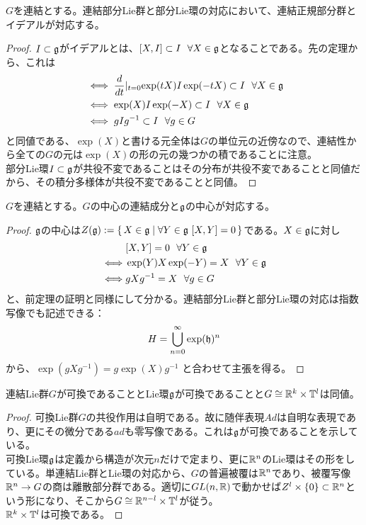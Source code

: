 \begin{thm}[正規部分群とイデアル]
    $G$を連結とする。連結部分Lie群と部分Lie環の対応において、連結正規部分群とイデアルが対応する。
\end{thm}
\begin{proof}
    $I\subset\mathfrak{g}$がイデアルとは、$[X,I]\subset I\ \ \forall X\in\mathfrak{g}$となることである。先の定理から、これは
    \begin{align*}
        &\iff\diff{}{t}\lvert_{t=0}\exp(tX)I\exp(-tX)\subset I\ \ \forall X\in\g\\
        &\iff\exp(X)I\exp(-X)\subset I\ \ \forall X\in\g\\
        &\iff gIg^{-1}\subset I\ \ \forall g\in G
    \end{align*}
    と同値である、$\exp(X)$と書ける元全体は$G$の単位元の近傍なので、連結性から全ての$G$の元は$\exp(X)$の形の元の幾つかの積であることに注意。\\
    部分Lie環$I\subset\mathfrak{g}$が共役不変であることはその分布が共役不変であることと同値だから、その積分多様体が共役不変であることと同値。
\end{proof}
\begin{thm}[中心と中心]
    $G$を連結とする。$G$の中心の連結成分と$\mathfrak{g}$の中心が対応する。
\end{thm}
\begin{proof}
    $\mathfrak{g}$の中心は$Z(\g):=\set{X\in\g}{\forall Y\in\g\ [X,Y]=0}$である。$X\in\mathfrak{g}$に対し
    \begin{align*}
        & [X,Y]=0\ \ \forall Y\in\mathfrak{g}\\
        \iff & \exp(Y)X\exp(-Y)=X\ \ \forall Y\in\mathfrak{g}\\
        \iff & gXg^{-1}=X\ \ \forall g\in G
    \end{align*}
    と、前定理の証明と同様にして分かる。連結部分Lie群と部分Lie環の対応は指数写像でも記述できる：
    \[H=\bigcup_{n=0}^\infty \exp(\mathfrak{h})^n\]
    から、$\exp(gXg^{-1})=g\exp(X)g^{-1}$ と合わせて主張を得る。
\end{proof}
\begin{lem}[可換]
    連結Lie群$G$が可換であることとLie環$\mathfrak{g}$が可換であることと$G\cong\mathbb{R}^k\times\mathbb{T}^l$は同値。
\end{lem}
\begin{proof}
    可換Lie群$G$の共役作用は自明である。故に随伴表現$Ad$は自明な表現であり、更にその微分である$ad$も零写像である。これは$\mathfrak{g}$が可換であることを示している。\\
    可換Lie環$\mathfrak{g}$は定義から構造が次元$n$だけで定まり、更に$\mathbb{R}^n$のLie環はその形をしている。単連結Lie群とLie環の対応から、$G$の普遍被覆は$\mathbb{R}^n$であり、被覆写像$\mathbb{R}^n\to G$の商は離散部分群である。適切に$GL(n,\mathbb{R})$で動かせば$Z^l\times\{0\}\subset\mathbb{R}^n$という形になり、そこから$G\cong\mathbb{R}^{n-l}\times\mathbb{T}^l$が従う。\\
    $\mathbb{R}^k\times\mathbb{T}^l$は可換である。
\end{proof}
